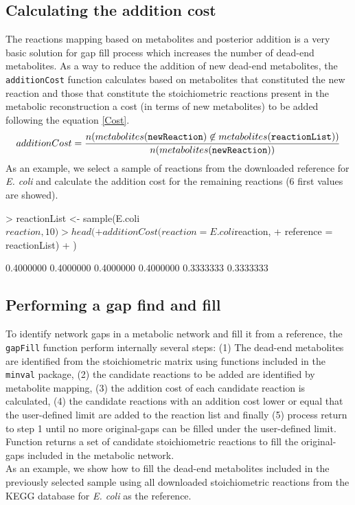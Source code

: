 \subsection*{Calculating the addition cost}
The reactions mapping based on metabolites and posterior addition is a very basic solution for gap fill process which increases the number of dead-end metabolites. As a way to reduce the addition of new dead-end metabolites, the \texttt{additionCost} function calculates based on metabolites that constituted the new reaction and those that constitute the stoichiometric reactions present in the metabolic reconstruction a cost (in terms of new metabolites) to be added following the equation \ref{Cost}.
\begin{equation}
\label{Cost}
additionCost = \dfrac{n(metabolites(\text{\texttt{newReaction}})\not\in metabolites(\text{\texttt{reactionList}}))}{n(metabolites(\text{\texttt{newReaction}}))}
\end{equation}
As an example, we select a sample of reactions from the downloaded reference for \emph{E. coli} and calculate the addition cost for the remaining reactions (6 first values are showed).
\begin{Schunk}
\begin{Sinput}
> reactionList <- sample(E.coli$reaction,10)
> head(
+   additionCost(reaction = E.coli$reaction,
+                reference = reactionList)
+ )
\end{Sinput}
\begin{Soutput}
[1] 0.4000000 0.4000000 0.4000000 0.4000000 0.3333333 0.3333333
\end{Soutput}
\end{Schunk}
\subsection*{Performing a gap find and fill}
To identify network gaps in a metabolic network and fill it from a reference, the \texttt{gapFill} function perform internally several steps: (1) The dead-end metabolites are identified from the stoichiometric matrix using functions included in the \texttt{minval} package, (2) the candidate reactions to be added are identified by metabolite mapping, (3) the addition cost of each candidate reaction is calculated, (4) the candidate reactions with an addition cost lower or equal that the user-defined limit are added to the reaction list and finally (5) process return to step 1 until no more original-gaps can be filled under the user-defined limit. Function returns a set of candidate stoichiometric reactions to fill the original-gaps included in the metabolic network.\\
As an example, we show how to fill the dead-end metabolites included in the previously selected sample using all downloaded stoichiometric reactions from the KEGG database for \emph{E. coli} as the reference.

